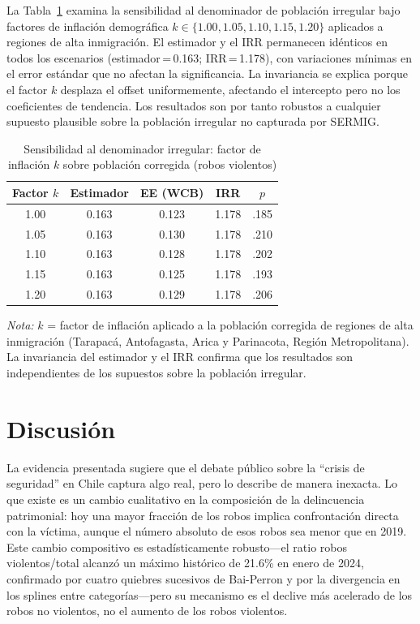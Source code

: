 \documentclass[12pt,a4paper]{article}
\newcommand{\tablenote}[1]{%
  \vspace{2pt}%
  \begin{minipage}{\linewidth}%
    \footnotesize\textit{Nota:} #1%
  \end{minipage}%
}
\begin{document}
La Tabla~\ref{tab:sensipop} examina la sensibilidad al denominador de poblaci\'on
irregular bajo factores de inflaci\'on demogr\'afica $k \in \{1.00, 1.05, 1.10,
1.15, 1.20\}$ aplicados a regiones de alta inmigraci\'on. El estimador y el IRR
permanecen id\'enticos en todos los escenarios (estimador\,=\,0.163; IRR\,=\,1.178),
con variaciones m\'inimas en el error est\'andar que no afectan la significancia. La
invariancia se explica porque el factor $k$ desplaza el offset uniformemente, afectando
el intercepto pero no los coeficientes de tendencia. Los resultados son por tanto robustos
a cualquier supuesto plausible sobre la poblaci\'on irregular no capturada por SERMIG.

\begin{table}[H]
\centering
\caption{Sensibilidad al denominador irregular: factor de inflaci\'on $k$ sobre
poblaci\'on corregida (robos violentos)}
\label{tab:sensipop}
\small
\begin{tabular}{ccccc}
\toprule
\textbf{Factor $k$} & \textbf{Estimador} & \textbf{EE (WCB)} & \textbf{IRR} & $p$ \\
\midrule
1.00 & 0.163 & 0.123 & 1.178 & .185 \\
1.05 & 0.163 & 0.130 & 1.178 & .210 \\
1.10 & 0.163 & 0.128 & 1.178 & .202 \\
1.15 & 0.163 & 0.125 & 1.178 & .193 \\
1.20 & 0.163 & 0.129 & 1.178 & .206 \\
\bottomrule
\end{tabular}
\tablenote{$k$ = factor de inflaci\'on aplicado a la poblaci\'on corregida de regiones
de alta inmigraci\'on (Tarapac\'a, Antofagasta, Arica y Parinacota, Regi\'on
Metropolitana). La invariancia del estimador y el IRR confirma que los resultados son
independientes de los supuestos sobre la poblaci\'on irregular.}
\end{table}


\section{Discusi\'on}
\label{sec:discusion}

La evidencia presentada sugiere que el debate p\'ublico sobre la ``crisis de seguridad''
en Chile captura algo real, pero lo describe de manera inexacta. Lo que existe es un
cambio cualitativo en la composici\'on de la delincuencia patrimonial: hoy una mayor
fracci\'on de los robos implica confrontaci\'on directa con la v\'ictima, aunque el
n\'umero absoluto de esos robos sea menor que en 2019. Este cambio compositivo es
estad\'isticamente robusto---el ratio robos violentos/total alcanz\'o un m\'aximo
hist\'orico de 21.6\% en enero de 2024, confirmado por cuatro quiebres sucesivos de
Bai-Perron y por la divergencia en los splines entre categor\'ias---pero su mecanismo
es el declive m\'as acelerado de los robos no violentos, no el aumento de los robos
violentos.
\end{document}
